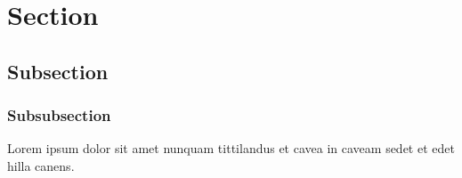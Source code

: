 \documentclass[a4paper,10pt]{article}
\begin{document}
	\maketitle

	\tableofcontents
	
	\section{Section}
	\subsection{Subsection}
	\subsubsection{Subsubsection}
	
	Lorem ipsum dolor sit amet nunquam tittilandus et cavea in caveam sedet et edet hilla canens.
\end{document}
